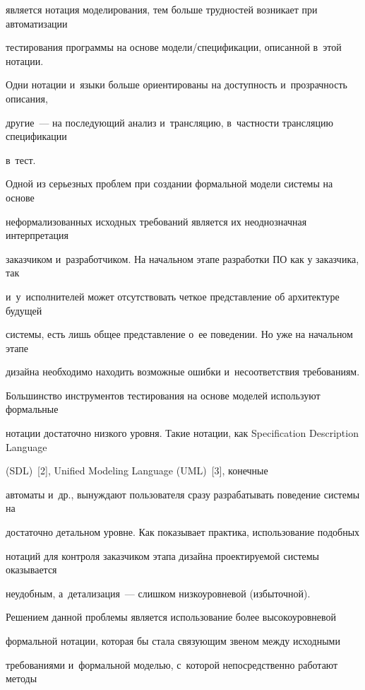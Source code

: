 является нотация моделирования, тем больше трудностей возникает при автоматизации


тестирования программы на основе мо\-де\-ли/спецификации, описанной в~этой нотации.


Одни нотации и~языки больше ориентированы на доступность и~прозрачность описания,


другие~--- на последующий анализ и~трансляцию, в~частности трансляцию спецификации


в~тест.





   Одной из серьезных проблем при создании формальной модели системы на основе


неформализованных исходных требований является их неоднозначная интерпретация


заказчиком и~разработчиком. На начальном этапе разработки ПО как у заказчика, так


и~у~исполнителей может отсутствовать четкое пред\-став\-ле\-ние об архитектуре будущей


системы, есть лишь общее представление о~ее поведении. Но уже на начальном этапе


дизайна необходимо находить возможные ошибки и~несоответствия требованиям.


Большинство инструментов тестирования на основе моделей используют формальные


нотации достаточно низкого уровня. Такие нотации, как Specification Description Language


(SDL)~[2], Unified Modeling Language (UML)~[3], конечные


автоматы и~др., вынуждают пользователя сразу разрабатывать поведение системы на


достаточно детальном уровне. Как показывает практика, использование подобных


нотаций для контроля заказчиком этапа дизайна проектируемой системы оказывается


неудобным, а~детализация~--- слишком низкоуровневой (избыточной).





   Решением данной проблемы является использование более высокоуровневой


формальной нотации, которая бы стала связующим звеном между исходными


требованиями и~формальной моделью, с~которой непосредственно работают методы


